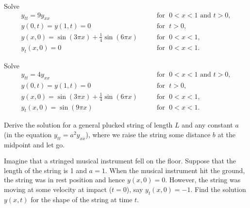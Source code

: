 \begin{exercise}
Solve
\begin{equation*}
\begin{array}{ll}
y_{tt} = 9 y_{xx}  & \qquad \text{for } \; 0 < x < 1 \text{ and } t > 0,  \\
y(0,t) = y(1,t) = 0 & \qquad \text{for } \; t > 0 ,  \\
y(x,0) = \sin (3\pi x) + \frac{1}{4} \sin (6 \pi x) & \qquad \text{for } \; 0 < x < 1 , \\
y_t(x,0) = 0 & \qquad \text{for } \; 0 < x < 1 .
\end{array}
\end{equation*}
\end{exercise}

\begin{exercise}
Solve
\begin{equation*}
\begin{array}{ll}
y_{tt} = 4 y_{xx} & \qquad \text{for } \; 0 < x < 1 \text{ and } t > 0, \\
y(0,t) = y(1,t) = 0 & \qquad \text{for } \; t > 0,  \\
y(x,0) = \sin (3\pi x) + \frac{1}{4} \sin (6 \pi x) & \qquad \text{for } \; 0 < x < 1 , \\
y_t(x,0) = \sin (9 \pi x) & \qquad \text{for } \; 0 < x < 1 .
\end{array}
\end{equation*}
\end{exercise}

\begin{exercise}
Derive the solution for a general plucked string of length $L$ and
any constant $a$ (in the equation $y_{tt} = a^2 y_{xx}$), where we
raise the string some distance $b$ at the midpoint and let go.
\end{exercise}

\begin{samepage}
\begin{exercise}
Imagine that a stringed musical instrument fell on the floor.  Suppose that
the length of the string is 1 and $a=1$.  When the musical instrument hit
the ground, the string was in rest position and hence $y(x,0) = 0$.  However,
the string was moving at some velocity at impact ($t=0$),
say $y_t(x,0) = -1$.  Find the
solution
$y(x,t)$ for the shape of the string at time $t$.
\end{exercise}
\end{samepage}


